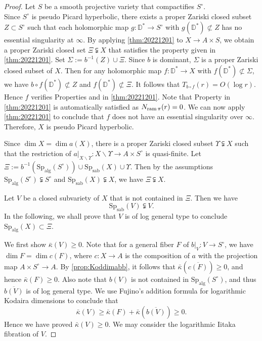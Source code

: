 \documentclass[11pt,english]{smfart}
\theoremstyle{plain}
\theoremstyle{definition}
\theoremstyle{remark}
\numberwithin{equation}{section}
\theoremstyle{plain}
\newcommand{\bD}{\mathbb{D}}
\newcommand{\Spab}{\mathrm{Sp}_{\mathrm{sab}}}
\newcommand{\Spalg}{\mathrm{Sp}_{\mathrm{alg}}}
\newcommand{\ram}{{\rm ram}\,}
\begin{document}
	\begin{proof}
		Let $S$ be a smooth projective variety that compactifies $S^\circ$. 
		\\
			Since $S^\circ$ is pseudo Picard hyperbolic, there exists a proper Zariski closed subset $Z\subset S^\circ$ such that each holomorphic map $g:\bD^*\to S^\circ$ with $g(\bD^*)\not\subset Z$ has no essential singularity at $\infty$. 
		By applying \cref{thm:20221201} to $X\to A\times S$, we obtain a proper Zariski closed set $\Xi\subsetneqq X$ that satisfies the property given in \cref{thm:20221201}. Set $\Sigma:=b^{-1}(Z)\cup \Xi$.  Since $b$ is dominant, $\Sigma$ is a proper Zariski closed subset of $X$.  Then for any holomorphic map $f:\bD^*\to X$ with $f(\bD^*)\not\subset \Sigma$, we have $b\circ f(\bD^*)\not\subset Z$ and $f(\bD^*)\not\subset \Xi$. It follows that
		$
		T_{b\circ f}(r)=O(\log r).
		$ 
		Hence $f$ verifies Properties  and  in   \cref{thm:20221201}. 
		Note that Property   in \cref{thm:20221201} is automatically satisfied as  $N_{\ram\pi}(r)=0$. We can now apply \cref{thm:20221201} to conclude that $f$ does not have an essential singularity over $\infty$. Therefore, $X$ is pseudo Picard hyperbolic.
		
		\medspace
		
		Since $\dim X = \dim a(X)$, there is a proper Zariski closed subset $\Upsilon \subsetneqq X$ such that the restriction of $a|_{X \backslash \Upsilon}:X \backslash \Upsilon\to A\times S^\circ$ is quasi-finite. 
		Let $\Xi := b^{-1}(\Spalg(S^\circ)) \cup \Spab(X) \cup \Upsilon$.  
		Then by the assumptions $\Spalg(S^\circ)\subsetneqq S^\circ$ and $\Spab(X)\subsetneqq X$, we have $\Xi\subsetneqq X$.
		
		
		Let $V$ be a closed subvariety of $X$ that is not contained in $\Xi$. Then we have
		\begin{equation}\label{eqn:20230510}
			\Spab(V)\subsetneqq V.
		\end{equation} 
		In the following, we shall prove that $V$ is of log general type to conclude $\Spalg(X)\subset \Xi$.
		
		
		We first show $\bar{\kappa}(V)\geq 0$.
		Note that for a general fiber $F$ of $b|_{V}:V\to S^\circ$, we have $\dim F=\dim c(F)$, where $c:X\to A$ is the composition of $a$ with the projection map $A\times S^\circ\to A$. 
		By \cref{prop:Koddimabb}, it follows that $\bar{\kappa}(\overline{c(F)})\geq 0$, and hence $\bar{\kappa}(F)\geq 0$. 
		Also note that $b(V)$ is not contained in $\Spalg(S^\circ)$, and thus $\overline{b(V)}$ is of log general type.  
		We use Fujino's addition formula for logarithmic Kodaira dimensions \cite[Theorem 1.9]{Fuj17} to conclude that $$\bar{\kappa}(V)\geq \bar{\kappa}(F)+\bar{\kappa}(\overline{b(V)})\geq 0.$$  
		Hence we have proved $\bar{\kappa}(V)\geq 0$.
		We may consider the logarithmic Iitaka fibration of $V$.
		

\end{proof}
\end{document}
